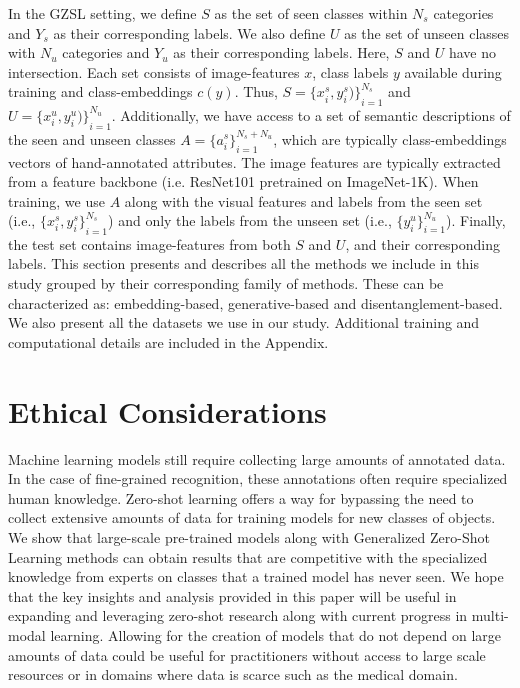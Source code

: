 In the GZSL setting, we define $S$ as the set of seen classes within $N_s$ categories and $Y_s$ as their corresponding labels. We also define $U$ as the set of unseen classes with $N_u$ categories and $Y_u$ as their corresponding labels. Here, $S$ and $U$ have no intersection. 
Each set consists of image-features $x$, class labels $y$ available during training and class-embeddings $c(y)$. 
Thus, $S = \{ {x_{i}^{s}, y_{i}^{s}) \} }^{N_{s}}_{i=1}$ and $U = \{ {x_{i}^{u}, y_{i}^{u}) \} }^{N_{u}}_{i=1}$. 
Additionally, we have access to a set of semantic descriptions of the seen and unseen classes $A = \{ {a_{i}^{s} \} }^{N_{s} + N_{u} }_{i=1}$, which are typically class-embeddings vectors of hand-annotated  attributes. The image features are typically extracted from a feature backbone (i.e. ResNet101 pretrained on ImageNet-1K).
When training, we use $A$ along with the visual features and labels from the seen set (i.e., $ \{ {x_{i}^{s}, y_{i}^{s} \} }^{N_{s}}_{i=1}$) and only the labels from the unseen set (i.e., $ \{ y_{i}^{u} \} ^{N_{u}}_{i=1}$). Finally, the test set contains image-features from both $S$ and $U$, and their corresponding labels.
This section presents and describes all the methods we include in this study grouped by their corresponding family of methods. These can be characterized as: embedding-based, generative-based and disentanglement-based. We also present all the datasets we use in our study. Additional training and computational details are included in the Appendix.



\section{Ethical Considerations}
\label{ethical}


Machine learning models still require collecting large amounts of annotated data. In the case of fine-grained recognition, these annotations often require specialized human knowledge. Zero-shot learning offers a way for bypassing the need to collect extensive amounts of data for training models for new classes of objects. 
We show that large-scale pre-trained models along with Generalized Zero-Shot Learning methods can obtain results that are competitive with the specialized knowledge from experts on classes that a trained model has never seen. We hope that the key insights and analysis provided in this paper will be useful in expanding and leveraging zero-shot research along with current progress in multi-modal learning. Allowing for the creation of models that do not depend on large amounts of data could be useful for practitioners without access to large scale resources or in domains where data is scarce such as the medical domain. 


